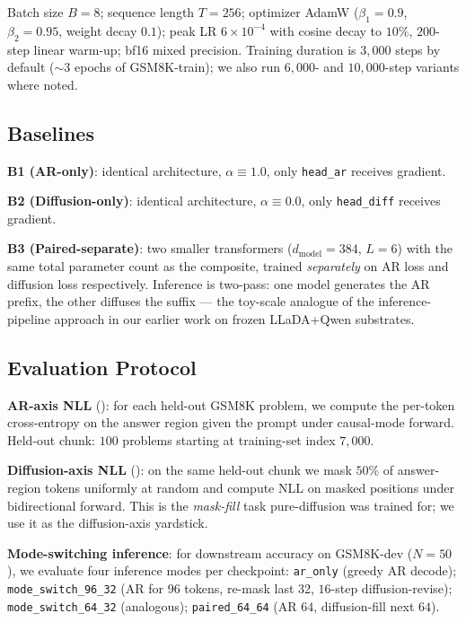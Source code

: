 Batch size $B = 8$; sequence length $T = 256$; optimizer AdamW
($\beta_1=0.9$, $\beta_2=0.95$, weight decay $0.1$); peak LR
$6\times 10^{-4}$ with cosine decay to $10\%$, $200$-step linear
warm-up; bf16 mixed precision. Training duration is $3{,}000$ steps by
default ($\sim 3$ epochs of GSM8K-train); we also run $6{,}000$- and
$10{,}000$-step variants where noted.

\subsection{Baselines}

\textbf{B1 (AR-only)}: identical architecture, $\alpha \equiv 1.0$,
only \texttt{head\_ar} receives gradient.

\textbf{B2 (Diffusion-only)}: identical architecture, $\alpha \equiv
0.0$, only \texttt{head\_diff} receives gradient.

\textbf{B3 (Paired-separate)}: two smaller transformers
($d_{\text{model}}=384$, $L=6$) with the same total parameter count as
the composite, trained \emph{separately} on AR loss and diffusion loss
respectively. Inference is two-pass: one model generates the AR
prefix, the other diffuses the suffix --- the toy-scale analogue of
the inference-pipeline approach in our earlier work on frozen
LLaDA+Qwen substrates.

\subsection{Evaluation Protocol}

\textbf{AR-axis NLL} (\arNLL): for each held-out GSM8K problem, we
compute the per-token cross-entropy on the answer region given the
prompt under causal-mode forward. Held-out chunk: $100$ problems
starting at training-set index $7{,}000$.

\textbf{Diffusion-axis NLL} (\diffNLL): on the same held-out chunk we
mask $50\%$ of answer-region tokens uniformly at random and compute
NLL on masked positions under bidirectional forward. This is the
\emph{mask-fill} task pure-diffusion was trained for; we use it as
the diffusion-axis yardstick.

\textbf{Mode-switching inference}: for downstream accuracy on GSM8K-dev
($N=50$), we evaluate four inference modes per checkpoint:
\texttt{ar\_only} (greedy AR decode); \texttt{mode\_switch\_96\_32}
(AR for 96 tokens, re-mask last 32, $16$-step diffusion-revise);
\texttt{mode\_switch\_64\_32} (analogous); \texttt{paired\_64\_64} (AR
$64$, diffusion-fill next $64$).

